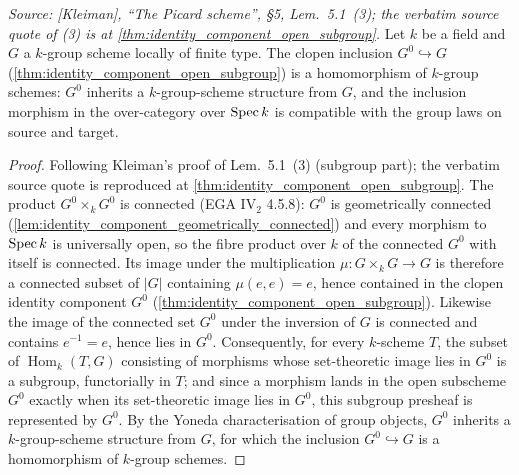 \begin{theorem}\leanok
  \label{thm:identity_component_is_subgroup_homomorphism}

  \textit{Source: [Kleiman], ``The Picard scheme'', \S 5,
  Lem.~5.1~(3); the verbatim source quote of (3) is at
  \cref{thm:identity_component_open_subgroup}.}
  Let \(k\) be a field and \(G\) a \(k\)-group scheme locally of finite
  type. The clopen inclusion \(G^0 \hookrightarrow G\)
  (\cref{thm:identity_component_open_subgroup}) is a homomorphism of
  \(k\)-group schemes: \(G^0\) inherits a \(k\)-group-scheme structure
  from \(G\), and the inclusion morphism in the over-category over
  \(\operatorname{Spec} k\) is compatible with the group laws on source and target.
\end{theorem}

\begin{proof}
  \leanok
  Following Kleiman's proof of Lem.~5.1~(3) (subgroup part); the
  verbatim source quote is reproduced at
  \cref{thm:identity_component_open_subgroup}.
  The product \(G^0 \times_k G^0\) is connected (EGA IV\(_2\) 4.5.8):
  \(G^0\) is geometrically connected
  (\cref{lem:identity_component_geometrically_connected}) and every
  morphism to \(\operatorname{Spec} k\) is universally open, so the fibre product over
  \(k\) of the connected \(G^0\) with itself is connected. Its image under
  the multiplication \(\mu : G \times_k G \to G\) is therefore a connected
  subset of \(|G|\) containing \(\mu(e, e) = e\), hence contained in the
  clopen identity component \(G^0\)
  (\cref{thm:identity_component_open_subgroup}). Likewise the image of the
  connected set \(G^0\) under the inversion of \(G\) is connected and
  contains \(e^{-1} = e\), hence lies in \(G^0\). Consequently, for every
  \(k\)-scheme \(T\), the subset of \(\operatorname{Hom}_k(T, G)\)
  consisting of morphisms whose set-theoretic image lies in \(G^0\) is a
  subgroup, functorially in \(T\); and since a morphism lands in the open
  subscheme \(G^0\) exactly when its set-theoretic image lies in \(G^0\),
  this subgroup presheaf is represented by \(G^0\). By the Yoneda
  characterisation of group objects, \(G^0\) inherits a \(k\)-group-scheme
  structure from \(G\), for which the inclusion \(G^0 \hookrightarrow G\)
  is a homomorphism of \(k\)-group schemes.
\end{proof}


